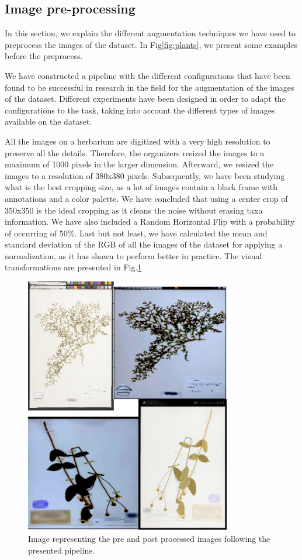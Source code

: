 \documentclass{article}
\begin{document}
\subsection{Image pre-processing}
\label{augmentations}

In this section, we explain the different augmentation techniques we have used to preprocess the images of the dataset. In Fig\ref{fig:plants}, we present some examples before the preprocess.

We have constructed a pipeline with the different configurations that have been found to be successful in research in the field for the augmentation of the images of the dataset. Different experiments have been designed in order to adapt the configurations to the task, taking into account the different types of images available on the dataset.

All the images on a herbarium are digitized with a very high resolution to preserve all the details. Therefore, the organizers resized the images to a maximum of 1000 pixels in the larger dimension. Afterward, we resized the images to a resolution of 380x380 pixels. Subsequently, we have been studying what is the best cropping size, as a lot of images contain a black frame with annotations and a color palette. We have concluded that using a center crop of 350x350 is the ideal cropping as it cleans the noise without erasing taxa information. We have also included a Random Horizontal Flip with a probability of occurring of 50\%. Last but not least, we have calculated the mean and standard deviation of the RGB of all the images of the dataset for applying a normalization, as it has shown to perform better in practice. The visual transformations are presented in Fig.\ref{fig:process}

\begin{figure}[h]
    \centering
    \includegraphics[width=9cm]{process}
    \caption{Image representing the pre and post processed images following the presented pipeline.}
    \label{fig:process}

\end{figure}
\end{document}
